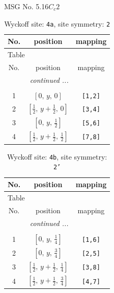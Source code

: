 \documentclass[fleqn,8pt]{jsarticle}
\begin{document}
\setcounter{MaxMatrixCols}{32}

\renewcommand{\tablename}{Table~}
\renewcommand{\figurename}{Figure~}
\begin{center}
\LARGE
MSG No. 5.16\quad$C_{c}2$
\end{center}
\renewcommand{\arraystretch}{1.2}
\begin{longtable}{ccc}
\caption{Wyckoff site: {\tt 4a}, site symmetry: {\tt 2}}
 \\
 \hline \hline
No. & position & mapping \\ \hline \endfirsthead

\multicolumn{2}{l}{\tablename\ \thetable{}} \\
 \hline \hline
No. & position & mapping \\ \hline \endhead

 \hline \hline
\multicolumn{2}{r}{\footnotesize\it continued ...} \\ \endfoot

 \hline \hline
\multicolumn{2}{r}{} \\ \endlastfoot

1 & $\left[ 0,\, y,\, 0 \right]$ & {\tt [1,2]} \\ \hline
2 & $\left[ \frac{1}{2},\, y + \frac{1}{2},\, 0 \right]$ & {\tt [3,4]} \\ \hline
3 & $\left[ 0,\, y,\, \frac{1}{2} \right]$ & {\tt [5,6]} \\ \hline
4 & $\left[ \frac{1}{2},\, y + \frac{1}{2},\, \frac{1}{2} \right]$ & {\tt [7,8]} \\
\end{longtable}
\renewcommand{\arraystretch}{1.2}
\begin{longtable}{ccc}
\caption{Wyckoff site: {\tt 4b}, site symmetry: {\tt 2'}}
 \\
 \hline \hline
No. & position & mapping \\ \hline \endfirsthead

\multicolumn{2}{l}{\tablename\ \thetable{}} \\
 \hline \hline
No. & position & mapping \\ \hline \endhead

 \hline \hline
\multicolumn{2}{r}{\footnotesize\it continued ...} \\ \endfoot

 \hline \hline
\multicolumn{2}{r}{} \\ \endlastfoot

1 & $\left[ 0,\, y,\, \frac{1}{4} \right]$ & {\tt [1,6]} \\ \hline
2 & $\left[ 0,\, y,\, \frac{3}{4} \right]$ & {\tt [2,5]} \\ \hline
3 & $\left[ \frac{1}{2},\, y + \frac{1}{2},\, \frac{1}{4} \right]$ & {\tt [3,8]} \\ \hline
4 & $\left[ \frac{1}{2},\, y + \frac{1}{2},\, \frac{3}{4} \right]$ & {\tt [4,7]} \\
\end{longtable}
\end{document}
